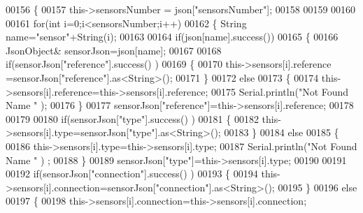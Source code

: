 \begin{DoxyCode}
00156             \{
00157                 this->sensorsNumber = json[\textcolor{stringliteral}{"sensorsNumber"}];
00158                 
00159                 
00160 
00161                 \textcolor{keywordflow}{for}(\textcolor{keywordtype}{int} i=0;i<sensorsNumber;i++)
00162                 \{   String name=\textcolor{stringliteral}{"sensor"}+String(i);
00163                     
00164                     \textcolor{keywordflow}{if}(json[name].success())
00165                     \{  
00166                         JsonObject& sensorJson=json[name];
00167                         
00168                         \textcolor{keywordflow}{if}(sensorJson[\textcolor{stringliteral}{"reference"}].success() )
00169                         \{  
00170                             this->sensors[i].reference =sensorJson[\textcolor{stringliteral}{"reference"}].as<String>();
00171                         \}
00172                         \textcolor{keywordflow}{else}
00173                         \{
00174                             this->sensors[i].reference=this->sensors[i].reference;                          
00175                             Serial.println(\textcolor{stringliteral}{"Not Found Name "} );     
00176                         \}
00177                         sensorJson[\textcolor{stringliteral}{"reference"}]=this->sensors[i].reference;
00178 
00179                     
00180                         \textcolor{keywordflow}{if}(sensorJson[\textcolor{stringliteral}{"type"}].success() )
00181                         \{                   
00182                             this->sensors[i].type=sensorJson[\textcolor{stringliteral}{"type"}].as<String>();
00183                         \}
00184                         \textcolor{keywordflow}{else}
00185                         \{
00186                             this->sensors[i].type=this->sensors[i].type;
00187                             Serial.println(\textcolor{stringliteral}{"Not Found Name "} ) ;                        
00188                         \}
00189                         sensorJson[\textcolor{stringliteral}{"type"}]=this->sensors[i].type;
00190                     
00191                     
00192                         \textcolor{keywordflow}{if}(sensorJson[\textcolor{stringliteral}{"connection"}].success() )
00193                         \{
00194                             this->sensors[i].connection=sensorJson[\textcolor{stringliteral}{"connection"}].as<String>();
00195                         \}
00196                         \textcolor{keywordflow}{else}
00197                         \{
00198                             this->sensors[i].connection=this->sensors[i].connection;

\end{DoxyCode}
